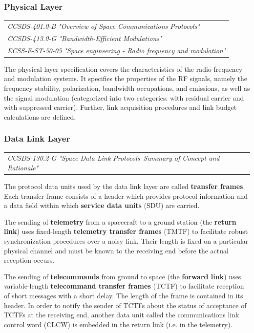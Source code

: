\subsubsection{Physical Layer}

\begin{tabular}{l}
\textit{CCSDS-401.0-B "Overview of Space Communications Protocols" \cite{CCSDS-401.0-B}} \\
\textit{CCSDS-413.0-G "Bandwidth-Efficient Modulations" \cite{CCSDS-413.0-G}} \\
\textit{ECSS-E-ST-50-05 "Space engineering - Radio frequency and modulation" \cite{ECSS-E-ST-50-05}}
\end{tabular}

The physical layer specification covers the characteristics of the radio frequency and modulation systems. It specifies the properties of the RF signals, namely the frequency stability, polarization, bandwidth occupations, and emissions, as well as the signal modulation (categorized into two categories: with residual carrier and with suppressed carrier). Further, link acquisition procedures and link budget calculations are defined.

\subsubsection{Data Link Layer}

\begin{tabular}{l}
\textit{CCSDS-130.2-G "Space Data Link Protocols--Summary of Concept and Rationale" \cite{CCSDS-130.2-G}}
\end{tabular}

The protocol data units used by the data link layer are called \textbf{transfer frames}. Each transfer frame consists of a header which provides protocol information and a data field within which \textbf{service data units} (SDU) are carried.

The sending of \textbf{telemetry} from a spacecraft to a ground station (the \textbf{return link}) uses fixed-length \textbf{telemetry transfer frames} (TMTF) to facilitate robust synchronization procedures over a noisy link. Their length is fixed on a particular physical channel and must be known to the receiving end before the actual reception occurs.

The sending of \textbf{telecommands} from ground to space (the \textbf{forward link}) uses variable-length \textbf{telecommand transfer frames} (TCTF) to facilitate reception of short messages with a short delay. The length of the frame is contained in its header. In order to notify the sender of TCTFs about the status of acceptance of TCTFs at the receiving end, another data unit called the communications link control word (CLCW) is embedded in the return link (i.e. in the telemetry). 

